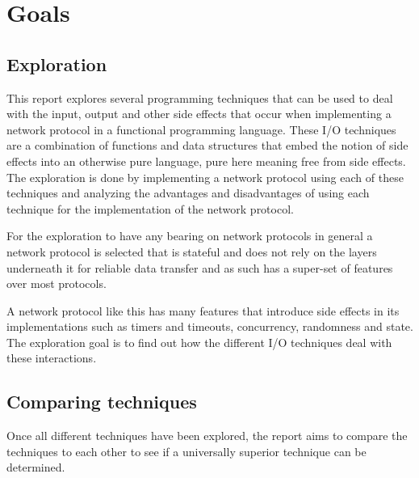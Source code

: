 \chapter{Goals}
\section{Exploration}
This report explores several programming techniques that can be used to deal with the input, output and other side effects that occur when implementing a network protocol in a functional programming language.
These I/O techniques are a combination of functions and data structures that embed the notion of side effects into an otherwise pure language, pure here meaning free from side effects.
The exploration is done by implementing a network protocol using each of these techniques and analyzing the advantages and disadvantages of using each technique for the implementation of the network protocol.

For the exploration to have any bearing on network protocols in general a network protocol is selected that is stateful and does not rely on the layers underneath it for reliable data transfer and as such has a super-set of features over most protocols. 

A network protocol like this has many features that introduce side effects in its implementations such as timers and timeouts, concurrency, randomness and state.
The exploration goal is to find out how the different I/O techniques deal with these interactions.

\section{Comparing techniques}
Once all different techniques have been explored, the report aims to compare the techniques to each other to see if a universally superior technique can be determined.
